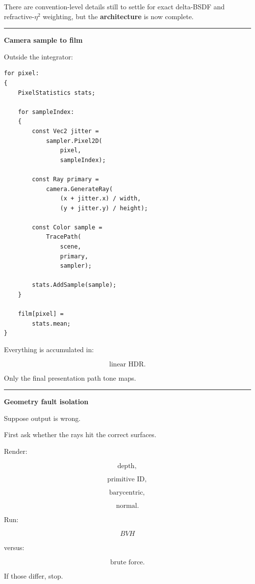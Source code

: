 There are convention-level details still to settle for exact delta-BSDF and refractive-\(\eta^2\) weighting, but the \textbf{architecture} is now complete.

\begin{center}\rule{0.5\linewidth}{0.5pt}\end{center}

\textbf{Camera sample to film}

Outside the integrator:

\begin{verbatim}
for pixel:
{
    PixelStatistics stats;

    for sampleIndex:
    {
        const Vec2 jitter =
            sampler.Pixel2D(
                pixel,
                sampleIndex);

        const Ray primary =
            camera.GenerateRay(
                (x + jitter.x) / width,
                (y + jitter.y) / height);

        const Color sample =
            TracePath(
                scene,
                primary,
                sampler);

        stats.AddSample(sample);
    }

    film[pixel] =
        stats.mean;
}
\end{verbatim}

Everything is accumulated in:

\[
\boxed{\text{linear HDR}.}
\]

Only the final presentation path tone maps.

\begin{center}\rule{0.5\linewidth}{0.5pt}\end{center}

\textbf{Geometry fault isolation}

Suppose output is wrong.

First ask whether the rays hit the correct surfaces.

Render:

\[
\text{depth},
\]

\[
\text{primitive ID},
\]

\[
\text{barycentric},
\]

\[
\text{normal}.
\]

Run:

\[
BVH
\]

versus:

\[
\text{brute force}.
\]

If those differ, stop.

